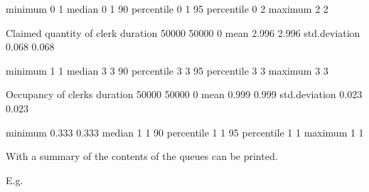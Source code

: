 \documentclass[letterpaper,10pt,english]{sphinxmanual}
\begin{document}
\begin{sphinxVerbatim}[commandchars=\\\{\}]
                                             minimum               0            1
                                             median                0            1
                                             90\PYGZpc{} percentile        0            1
                                             95\PYGZpc{} percentile        0            2
                                             maximum               2            2

Claimed quantity of clerk                    duration          50000        50000            0
                                             mean                  2.996        2.996
                                             std.deviation         0.068        0.068

                                             minimum               1            1
                                             median                3            3
                                             90\PYGZpc{} percentile        3            3
                                             95\PYGZpc{} percentile        3            3
                                             maximum               3            3

Occupancy of clerks                          duration          50000        50000            0
                                             mean                  0.999        0.999
                                             std.deviation         0.023        0.023

                                             minimum               0.333        0.333
                                             median                1            1
                                             90\PYGZpc{} percentile        1            1
                                             95\PYGZpc{} percentile        1            1
                                             maximum               1            1
\end{sphinxVerbatim}

With  a summary of the contents of the queues can be printed.

E.g.

%
\begin{sphinxVerbatim}[commandchars=\\\{\}]
 
   
            
            
   
            
            
            
\end{sphinxVerbatim}
\end{document}
